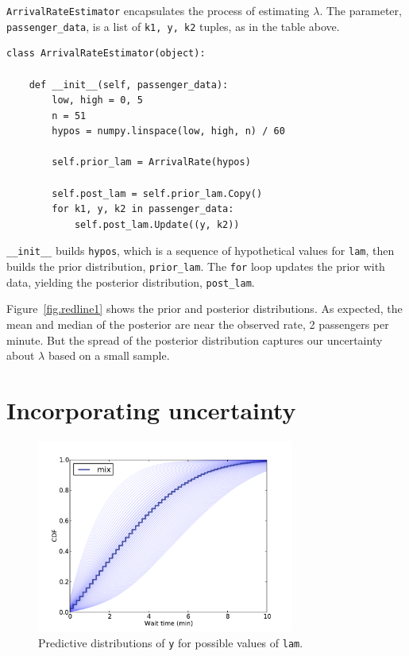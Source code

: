\documentclass[12pt]{book}
\begin{document}
{\tt ArrivalRateEstimator} encapsulates the process of estimating
$\lambda$.  The parameter, \verb"passenger_data", is a list
of {\tt k1, y, k2} tuples, as in the table above.

\begin{verbatim}
class ArrivalRateEstimator(object):

    def __init__(self, passenger_data):
        low, high = 0, 5
        n = 51
        hypos = numpy.linspace(low, high, n) / 60

        self.prior_lam = ArrivalRate(hypos)

        self.post_lam = self.prior_lam.Copy()
        for k1, y, k2 in passenger_data:
            self.post_lam.Update((y, k2))
\end{verbatim}

\verb"__init__" builds
{\tt hypos}, which is a sequence of hypothetical values for {\tt lam},
then builds the prior distribution, \verb"prior_lam".
The {\tt for} loop updates the prior with data, yielding the posterior
distribution, \verb"post_lam".

Figure~\ref{fig.redline1} shows
the prior and posterior distributions.  As expected, the mean and
median of the posterior are near the observed rate, 2 passengers per
minute.  But the spread of the posterior distribution captures our
uncertainty about $\lambda$ based on a small sample.


\section{Incorporating uncertainty}

\begin{figure}
\centerline{\includegraphics[height=2.5in]{figs/redline4.pdf}}
\caption{Predictive distributions of {\tt y} for possible values
  of {\tt lam}. }
\label{fig.redline4}
\end{figure}
\end{document}
